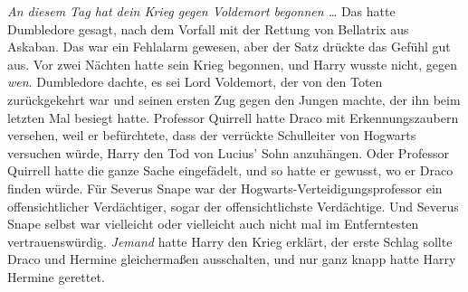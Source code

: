 \emph{An diesem Tag hat dein Krieg gegen Voldemort begonnen …}
Das hatte Dumbledore gesagt, nach dem Vorfall mit der Rettung von Bellatrix aus Askaban. Das war ein Fehlalarm gewesen, aber der Satz drückte das Gefühl gut aus.
Vor zwei Nächten hatte sein Krieg begonnen, und Harry wusste nicht, gegen \emph{wen}.
Dumbledore dachte, es sei Lord Voldemort, der von den Toten zurückgekehrt war und seinen ersten Zug gegen den Jungen machte, der ihn beim letzten Mal besiegt hatte.
Professor Quirrell hatte Draco mit Erkennungszaubern versehen, weil er befürchtete, dass der verrückte Schulleiter von Hogwarts versuchen würde, Harry den Tod von Lucius’ Sohn anzuhängen.
Oder Professor Quirrell hatte die ganze Sache eingefädelt, und so hatte er gewusst, wo er Draco finden würde. Für Severus Snape war der Hogwarts-Verteidigungsprofessor ein offensichtlicher Verdächtiger, sogar der offensichtlichste Verdächtige.
Und Severus Snape selbst war vielleicht oder vielleicht auch nicht mal im Entferntesten vertrauenswürdig.
\emph{Jemand} hatte Harry den Krieg erklärt, der erste Schlag sollte Draco und Hermine gleichermaßen ausschalten, und nur ganz knapp hatte Harry Hermine gerettet.
